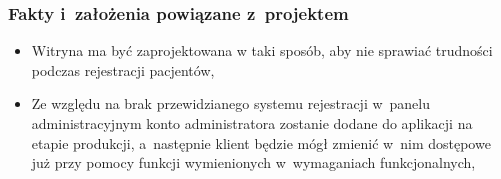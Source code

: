 \subsubsection{Fakty i~założenia powiązane z~projektem}
\begin{itemize}
	\item Witryna ma być zaprojektowana w taki sposób, aby nie sprawiać trudności podczas rejestracji pacjentów,
	\item Ze względu na brak przewidzianego systemu rejestracji w~panelu administracyjnym konto administratora zostanie dodane do aplikacji na etapie produkcji, a~następnie klient będzie mógł zmienić w~nim dostępowe już przy pomocy funkcji wymienionych w~wymaganiach funkcjonalnych,
\end{itemize}
